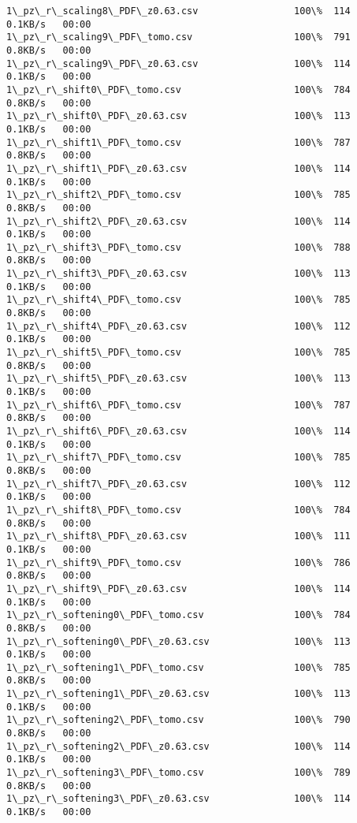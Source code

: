 \documentclass[11pt]{article}
\begin{document}
\begin{Verbatim}[commandchars=\\\{\}]
1\_pz\_r\_scaling8\_PDF\_z0.63.csv                 100\%  114     0.1KB/s   00:00    
1\_pz\_r\_scaling9\_PDF\_tomo.csv                  100\%  791     0.8KB/s   00:00    
1\_pz\_r\_scaling9\_PDF\_z0.63.csv                 100\%  114     0.1KB/s   00:00    
1\_pz\_r\_shift0\_PDF\_tomo.csv                    100\%  784     0.8KB/s   00:00    
1\_pz\_r\_shift0\_PDF\_z0.63.csv                   100\%  113     0.1KB/s   00:00    
1\_pz\_r\_shift1\_PDF\_tomo.csv                    100\%  787     0.8KB/s   00:00    
1\_pz\_r\_shift1\_PDF\_z0.63.csv                   100\%  114     0.1KB/s   00:00    
1\_pz\_r\_shift2\_PDF\_tomo.csv                    100\%  785     0.8KB/s   00:00    
1\_pz\_r\_shift2\_PDF\_z0.63.csv                   100\%  114     0.1KB/s   00:00    
1\_pz\_r\_shift3\_PDF\_tomo.csv                    100\%  788     0.8KB/s   00:00    
1\_pz\_r\_shift3\_PDF\_z0.63.csv                   100\%  113     0.1KB/s   00:00    
1\_pz\_r\_shift4\_PDF\_tomo.csv                    100\%  785     0.8KB/s   00:00    
1\_pz\_r\_shift4\_PDF\_z0.63.csv                   100\%  112     0.1KB/s   00:00    
1\_pz\_r\_shift5\_PDF\_tomo.csv                    100\%  785     0.8KB/s   00:00    
1\_pz\_r\_shift5\_PDF\_z0.63.csv                   100\%  113     0.1KB/s   00:00    
1\_pz\_r\_shift6\_PDF\_tomo.csv                    100\%  787     0.8KB/s   00:00    
1\_pz\_r\_shift6\_PDF\_z0.63.csv                   100\%  114     0.1KB/s   00:00    
1\_pz\_r\_shift7\_PDF\_tomo.csv                    100\%  785     0.8KB/s   00:00    
1\_pz\_r\_shift7\_PDF\_z0.63.csv                   100\%  112     0.1KB/s   00:00    
1\_pz\_r\_shift8\_PDF\_tomo.csv                    100\%  784     0.8KB/s   00:00    
1\_pz\_r\_shift8\_PDF\_z0.63.csv                   100\%  111     0.1KB/s   00:00    
1\_pz\_r\_shift9\_PDF\_tomo.csv                    100\%  786     0.8KB/s   00:00    
1\_pz\_r\_shift9\_PDF\_z0.63.csv                   100\%  114     0.1KB/s   00:00    
1\_pz\_r\_softening0\_PDF\_tomo.csv                100\%  784     0.8KB/s   00:00    
1\_pz\_r\_softening0\_PDF\_z0.63.csv               100\%  113     0.1KB/s   00:00    
1\_pz\_r\_softening1\_PDF\_tomo.csv                100\%  785     0.8KB/s   00:00    
1\_pz\_r\_softening1\_PDF\_z0.63.csv               100\%  113     0.1KB/s   00:00    
1\_pz\_r\_softening2\_PDF\_tomo.csv                100\%  790     0.8KB/s   00:00    
1\_pz\_r\_softening2\_PDF\_z0.63.csv               100\%  114     0.1KB/s   00:00    
1\_pz\_r\_softening3\_PDF\_tomo.csv                100\%  789     0.8KB/s   00:00    
1\_pz\_r\_softening3\_PDF\_z0.63.csv               100\%  114     0.1KB/s   00:00    

\end{Verbatim}
\end{document}
